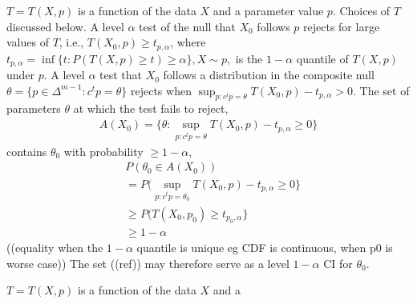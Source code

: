 \documentclass{article}
\renewcommand{\P}P
\newcommand{\T}T
\newcommand{\x}X
\newcommand{\p}p
\renewcommand{\c}c
\begin{document}
$\T=\T(\x,\p)$ is a function of the data $\x$ and a parameter value
$\p$. Choices of $\T$ discussed below. A level $\alpha$ test of the
null that $\x_0$ follows $\p$ rejects for large values of $\T$, i.e.,
$\T(\x_0,\p)\ge t_{\p,\alpha}$, where
$t_{\p,\alpha}=\inf\{t:\P(\T(\x,\p)\ge t)\ge\alpha\}, \x\sim\p,$ is
the $1-\alpha$ quantile of $\T(\x,\p)$ under $\p$. A level $\alpha$
test that $\x_0$ follows a distribution in the composite null
$\theta=\{\p\in \Delta^{m-1}:\c^t\p=\theta\}$ rejects when
$\sup_{\p:\c^t\p=\theta}\T(\x_0,\p)-t_{\p,\alpha}>0$. The set of
parameters $\theta$ at which the test fails to reject,
\begin{align}
  A(\x_0)=\{\theta : \sup_{\p:\c^t\p=\theta}\T(\x_0,\p)-t_{\p,\alpha} \ge 0\}
\end{align}
contains $\theta_0$ with probability $\ge 1-\alpha$,
\begin{align}
    &\P(\theta_0\in A(\x_0))\\
    &=\P(\sup_{\p:\c^t\p=\theta_0}\T(\x_0,\p)-t_{\p,\alpha} \ge 0\}\\
  &\ge \P(\T(\x_0,\p_0)\ge t_{\p_0,\alpha} \}\\
      &\ge 1-\alpha
\end{align}
((equality when the $1-\alpha$ quantile is unique eg CDF is continuous, when p0 is worse case))
The set ((ref)) may therefore serve as a level $1-\alpha$ CI for $\theta_0$.%


%
$\T=\T(\x,\p)$ is a function of the data $\x$ and a
\end{document}
